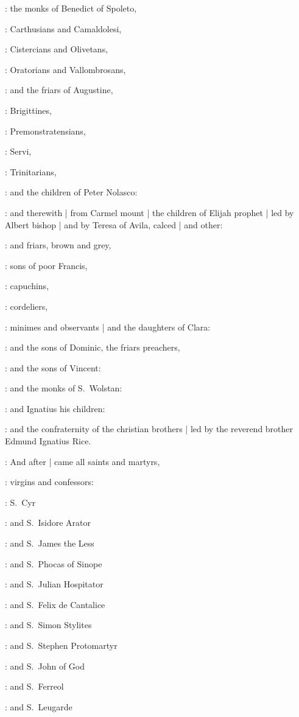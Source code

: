 :
the monks of Benedict of Spoleto,

:
Carthusians and Camaldolesi,

:
Cistercians and Olivetans,

:
Oratorians and Vallombrosans,

:
and the friars of Augustine,

:
Brigittines,

:
Premonstratensians,

:
Servi,

:
Trinitarians,

:
and the children of Peter Nolasco:

:
and therewith |
from Carmel mount |
the children of Elijah prophet |
led by Albert bishop |
and by Teresa of Avila,
calced |
and other:

:
and friars,
brown and grey,

:
sons of poor Francis,

:
capuchins,

:
cordeliers,

:
minimes and observants |
and the daughters of Clara:

:
and the sons of Dominic,
the friars preachers,

:
and the sons of Vincent:

:
and the monks of S.~Wolstan:

:
and Ignatius his children:

:
and the confraternity of the christian brothers |
led by the reverend brother Edmund Ignatius Rice.

:
And after |
came all saints and martyrs,

:
virgins and confessors:

:
S.~Cyr

:
and S.~Isidore Arator

:
and S.~James the Less

:
and S.~Phocas of Sinope

:
and S.~Julian Hospitator

:
and S.~Felix de Cantalice

:
and S.~Simon Stylites

:
and S.~Stephen Protomartyr

:
and S.~John of God

:
and S.~Ferreol

:
and S.~Leugarde

